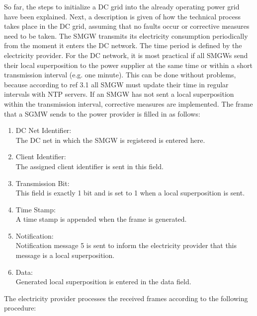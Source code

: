 So far, the steps to initialize a DC grid into the already operating power grid have been explained. Next, a description is given of how the technical process takes place in the DC grid, assuming that no faults occur or corrective measures need to be taken. The SMGW transmits its electricity consumption periodically from the moment it enters the DC network. The time period is defined by the electricity provider. For the DC network, it is most practical if all SMGWs send their local superposition to the power supplier at the same time or within a short transmission interval (e.g. one minute). This can be done without problems, because according to ref 3.1 all SMGW must update their time in regular intervals with NTP servers. If an SMGW has not sent a local superposition within the transmission interval, corrective measures are implemented. The frame that a SGMW sends to the power provider is filled in as follows:
\begin{enumerate}
\item DC Net Identifier:\\
The DC net in which the SMGW is registered is entered here.
\item Client Identifier:\\ 
The assigned client identifier is sent in this field.
\item Transmission Bit:\\
This field is exactly 1 bit and is set to 1 when a local superposition is sent.
\item Time Stamp:\\
A time stamp is appended when the frame is generated.
\item Notification:\\
Notification message 5 is sent to inform the electricity provider that this message is a local superposition.
\item Data:\\
Generated local superposition is entered in the data field.
\end{enumerate}
The electricity provider processes the received frames according to the following procedure:\\
